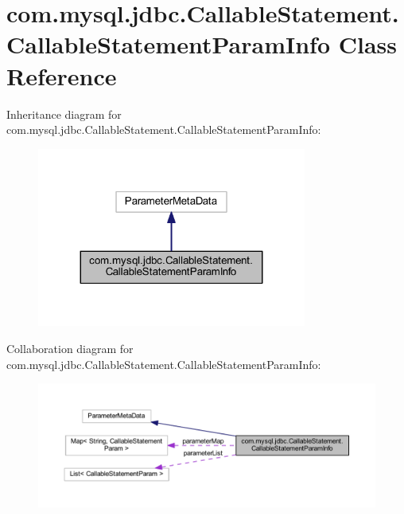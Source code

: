 \hypertarget{classcom_1_1mysql_1_1jdbc_1_1_callable_statement_1_1_callable_statement_param_info}{}\section{com.\+mysql.\+jdbc.\+Callable\+Statement.\+Callable\+Statement\+Param\+Info Class Reference}
\label{classcom_1_1mysql_1_1jdbc_1_1_callable_statement_1_1_callable_statement_param_info}


Inheritance diagram for com.\+mysql.\+jdbc.\+Callable\+Statement.\+Callable\+Statement\+Param\+Info\+:\nopagebreak
\begin{figure}[H]
\begin{center}
\leavevmode
\includegraphics[width=251pt]{classcom_1_1mysql_1_1jdbc_1_1_callable_statement_1_1_callable_statement_param_info__inherit__graph}
\end{center}
\end{figure}


Collaboration diagram for com.\+mysql.\+jdbc.\+Callable\+Statement.\+Callable\+Statement\+Param\+Info\+:\nopagebreak
\begin{figure}[H]
\begin{center}
\leavevmode
\includegraphics[width=350pt]{classcom_1_1mysql_1_1jdbc_1_1_callable_statement_1_1_callable_statement_param_info__coll__graph}
\end{center}
\end{figure}

